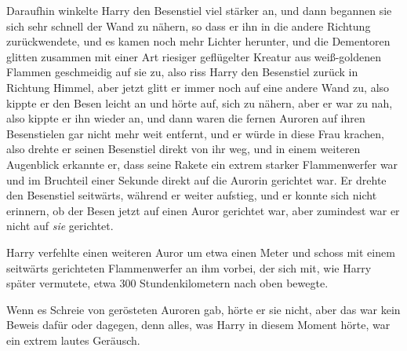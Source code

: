 Daraufhin winkelte Harry den Besenstiel viel stärker an, und dann begannen sie sich sehr schnell der Wand zu nähern, so dass er ihn in die andere Richtung zurückwendete, und es kamen noch mehr Lichter herunter, und die Dementoren glitten zusammen mit einer Art riesiger geflügelter Kreatur aus weiß-goldenen Flammen geschmeidig auf sie zu, also riss Harry den Besenstiel zurück in Richtung Himmel, aber jetzt glitt er immer noch auf eine andere Wand zu, also kippte er den Besen leicht an und hörte auf, sich zu nähern, aber er war zu nah, also kippte er ihn wieder an, und dann waren die fernen Auroren auf ihren Besenstielen gar nicht mehr weit entfernt, und er würde in diese Frau krachen, also drehte er seinen Besenstiel direkt von ihr weg, und in einem weiteren Augenblick erkannte er, dass seine Rakete ein extrem starker Flammenwerfer war und im Bruchteil einer Sekunde direkt auf die Aurorin gerichtet war. Er drehte den Besenstiel seitwärts, während er weiter aufstieg, und er konnte sich nicht erinnern, ob der Besen jetzt auf einen Auror gerichtet war, aber zumindest war er nicht auf \emph{sie} gerichtet.

Harry verfehlte einen weiteren Auror um etwa einen Meter und schoss mit einem seitwärts gerichteten Flammenwerfer an ihm vorbei, der sich mit, wie Harry später vermutete, etwa 300 Stundenkilometern nach oben bewegte.

Wenn es Schreie von gerösteten Auroren gab, hörte er sie nicht, aber das war kein Beweis dafür oder dagegen, denn alles, was Harry in diesem Moment hörte, war ein extrem lautes Geräusch.

